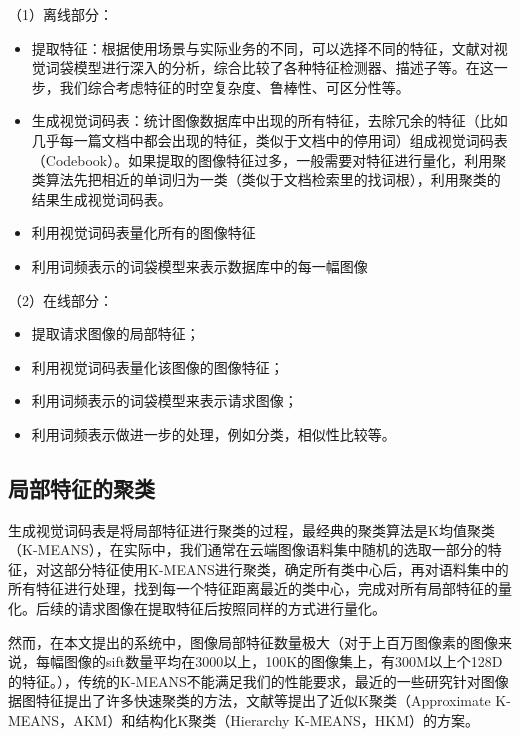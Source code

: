 （1）离线部分：
\begin{itemize}
\item 提取特征：根据使用场景与实际业务的不同，可以选择不同的特征，文献\cite{Zhang:2006ej}对视觉词袋模型进行深入的分析，综合比较了各种特征检测器、描述子等。在这一步，我们综合考虑特征的时空复杂度、鲁棒性、可区分性等。
\item 生成视觉词码表：统计图像数据库中出现的所有特征，去除冗余的特征（比如几乎每一篇文档中都会出现的特征，类似于文档中的停用词）组成视觉词码表（Codebook）。如果提取的图像特征过多，一般需要对特征进行量化，利用聚类算法先把相近的单词归为一类（类似于文档检索里的找词根），利用聚类的结果生成视觉词码表。
\item 利用视觉词码表量化所有的图像特征
\item 利用词频表示的词袋模型来表示数据库中的每一幅图像
\end{itemize}

（2）在线部分：
\begin{itemize}
\item 提取请求图像的局部特征；
\item 利用视觉词码表量化该图像的图像特征；
\item 利用词频表示的词袋模型来表示请求图像；
\item 利用词频表示做进一步的处理，例如分类，相似性比较等。
\end{itemize}


\subsection{局部特征的聚类}
生成视觉词码表是将局部特征进行聚类的过程，最经典的聚类算法是K均值聚类（K-MEANS），在实际中，我们通常在云端图像语料集中随机的选取一部分的特征，对这部分特征使用K-MEANS进行聚类，确定所有类中心后，再对语料集中的所有特征进行处理，找到每一个特征距离最近的类中心，完成对所有局部特征的量化。后续的请求图像在提取特征后按照同样的方式进行量化。

然而，在本文提出的系统中，图像局部特征数量极大（对于上百万图像素的图像来说，每幅图像的sift数量平均在3000以上，100K的图像集上，有300M以上个128D的特征。），传统的K-MEANS不能满足我们的性能要求，最近的一些研究针对图像据图特征提出了许多快速聚类的方法，文献\cite{Philbin:2007fk,Muja:2009uv,Wang:2010vs}等提出了近似K聚类（Approximate K-MEANS，AKM）和结构化K聚类（Hierarchy K-MEANS，HKM）的方案。

